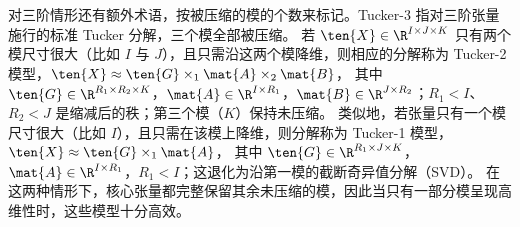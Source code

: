对三阶情形还有额外术语，按被压缩的模的个数来标记。Tucker-3 指对三阶张量施行的标准 Tucker 分解，三个模全部被压缩。
若 $\ten{X} \in \R^{I \times J \times K}$ 只有两个模尺寸很大（比如 $I$ 与 $J$），且只需沿这两个模降维，则相应的分解称为 Tucker-2 模型，$\ten{X} \approx \ten{G} \times_1 \mat{A} \times_2 \mat{B}$，
其中 $\ten{G} \in \R^{R_1 \times R_2 \times K}$，$\mat{A} \in \R^{I \times R_1}$，$\mat{B} \in \R^{J \times R_2}$；$R_1 < I$、$R_2 < J$ 是缩减后的秩；第三个模（$K$）保持未压缩。
类似地，若张量只有一个模尺寸很大（比如 $I$），且只需在该模上降维，则分解称为 Tucker-1 模型，$\ten{X} \approx \ten{G} \times_1 \mat{A}$，
其中 $\ten{G} \in \R^{R_1 \times J \times K}$，$\mat{A} \in \R^{I \times R_1}$，$R_1 < I$；这退化为沿第一模的截断奇异值分解（SVD）。
在这两种情形下，核心张量都完整保留其余未压缩的模，因此当只有一部分模呈现高维性时，这些模型十分高效。


\color{black}



